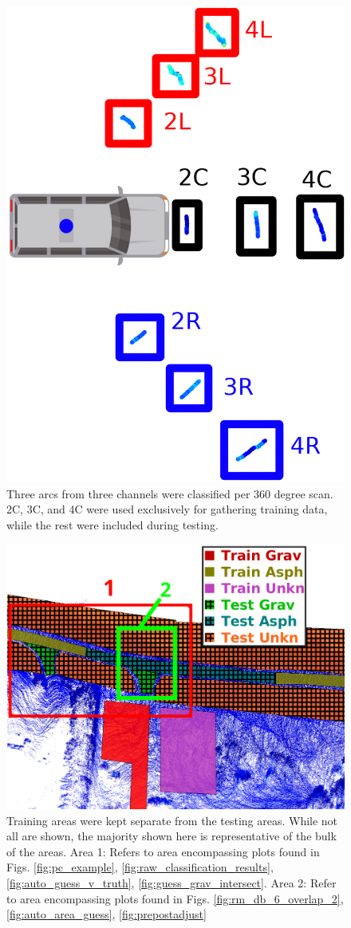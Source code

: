\documentclass[journal,onecolumn]{IEEEtran}
\begin{document}
			\begin{figure}[H]
				\centering
				\includegraphics[width=0.25\linewidth]{figures/nine_arcs_example}
				\caption[Areas to Classify]{Three arcs from three channels were classified per 360 degree scan. 2C, 3C, and 4C were used exclusively for gathering training data, while the rest were included during testing. }
				\label{fig:nine_arcs_example}
			\end{figure}

			\begin{figure}[H]
				\centering
				\includegraphics[width=0.95\linewidth]{figures/test_vs_train_areas_hatch_annotated}
				\caption[Training vs Testing Areas]{Training areas were kept separate from the testing areas. While not all are shown, the majority shown here is representative of the bulk of the areas. Area 1: Refers to area encompassing plots found in Figs. \ref{fig:pc_example}, \ref{fig:raw_classification_results}, \ref{fig:auto_guess_v_truth}, \ref{fig:guess_grav_intersect}. Area 2: Refer to area encompassing plots found in Figs. \ref{fig:rm_db_6_overlap_2}, \ref{fig:auto_area_guess}, \ref{fig:prepostadjust}    
				}
				\label{fig:test_vs_train_areas}
			\end{figure}
\end{document}
